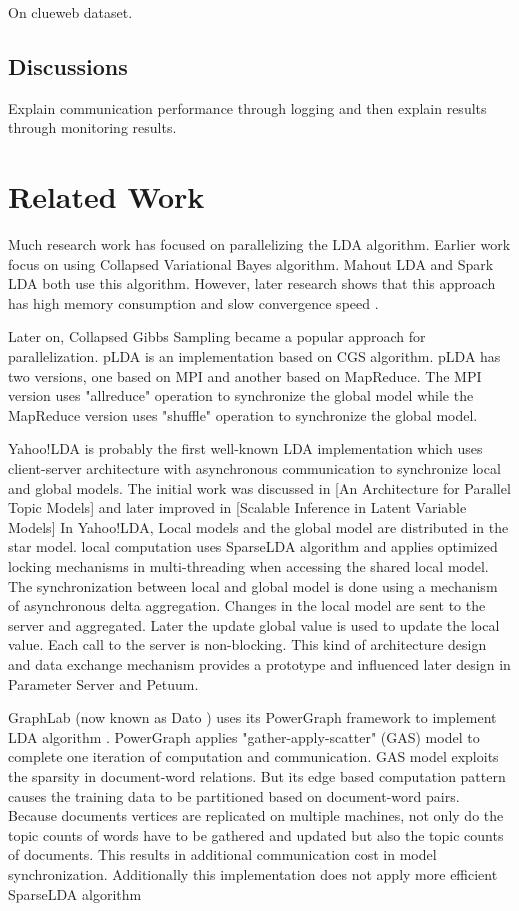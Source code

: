 \documentclass[conference]{IEEEtran}
\begin{document}
On clueweb dataset.

\subsection{Discussions}
Explain communication performance through logging and then explain results
through monitoring results.

%
%
\section{Related Work}
Much research work has focused on parallelizing the LDA algorithm.
Earlier work focus on using Collapsed Variational Bayes algorithm. 
Mahout LDA and Spark LDA both use this algorithm.
However, later research shows that 
this approach has high memory consumption \cite{12}
and slow convergence speed \cite{9}.

Later on, Collapsed Gibbs Sampling became a popular approach for parallelization. 
pLDA \cite{13} is an implementation based on CGS algorithm. pLDA has two versions, 
one based on MPI and another based on MapReduce.
The MPI version uses "allreduce" operation to synchronize the global model while
the MapReduce version uses "shuffle" operation to synchronize the global model.

Yahoo!LDA \cite{8} is probably the first well-known LDA implementation which 
uses client-server architecture with asynchronous communication
to synchronize local and global models.
The initial work was discussed in 
[An Architecture for Parallel Topic Models] and later improved in
[Scalable Inference in Latent Variable Models]
In Yahoo!LDA, Local models and the global model are distributed in the star model.  
local computation uses SparseLDA algorithm and applies optimized locking mechanisms
in multi-threading when accessing the shared local model.  
The synchronization between local and global model is done using a mechanism of
asynchronous delta aggregation.
Changes in the local model are sent to the server and aggregated.
Later the update global value is used to update the local value.
Each call to the server is non-blocking.
This kind of architecture design and data exchange mechanism provides a prototype and 
influenced later design in Parameter Server and Petuum.

GraphLab (now known as Dato \cite{5}) uses its PowerGraph framework \cite{18}
to implement LDA algorithm \cite{14}.
PowerGraph applies "gather-apply-scatter" (GAS) model to complete one iteration
of computation and communication. GAS model exploits the sparsity in document-word
relations. But its edge based computation pattern causes
the training data to be partitioned based on document-word pairs.
Because documents vertices are replicated on multiple machines,
not only do the topic counts of words have to be gathered and updated but also the
topic counts of documents.
This results in additional communication cost in model synchronization.
Additionally this implementation does not apply more efficient SparseLDA algorithm 
\end{document}
